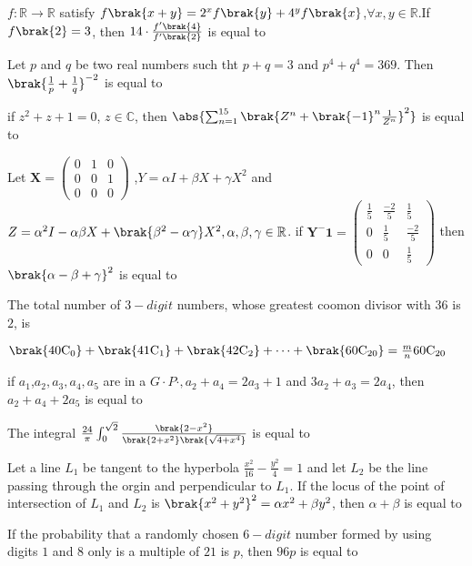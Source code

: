 \iffalse
\title{Assignment 3}
\author{AI24BTECH11018}
\section{integer}
\fi

\item $f: \mathbb{R} \to \mathbb{R}$ satisfy $f\brak{x+y}=2^xf\brak{y}+4^yf\brak{x}$,$\forall x,  y \in \mathbb{R}$.If $f\brak{2}=3$, then $14\cdot \frac{f^{\prime}\brak{4}}{f^{\prime}\brak{2}}$ is equal to 
\hfill{}
    \item Let $p$ and $q$ be two real numbers such tht $p+q=3$
and $p^4+q^4=369$. Then $\brak{\frac{1}{p}+\frac{1}{q}}^{-2}$ is equal to 
\hfill{}
\item if $z^2+z+1=0$, $z \in \mathbb{C}$, then $\abs{\sum_{n=1}^{15}\brak{Z^n+{\brak{-1}^n\frac{1}{Z^n}}}^2}$ is equal to
\hfill{}
\item Let $\mathbf{X} = \begin{pmatrix}
0 & 1 & 0 \\
0 & 0 & 1 \\
0 & 0 & 0
\end{pmatrix}$ ,$Y=\alpha I+\beta X+\gamma X^2$ and $Z={\alpha^2}I-\alpha \beta X+\brak{{\beta^2}-\alpha \gamma}X^2,\alpha ,\beta ,\gamma \in \mathbb{R}$. if $\mathbf{Y^-1} = \begin{pmatrix}
\frac{1}{5} & \frac{-2}{5} & \frac{1}{5} \\
0 & \frac{1}{5} & \frac{-2}{5} \\
0 & 0 & \frac{1}{5}
\end{pmatrix}$ then $\brak{\alpha -\beta +\gamma}^2$ is equal to
\hfill{}
\item The total number of $3-digit$ numbers, whose greatest coomon divisor with $36$ is $2$, is
\hfill{}
\item $\brak{\mathrm{40C_0}}+\brak{\mathrm{41C_1}}+\brak{\mathrm{42C_2}}+\cdots +\brak{\mathrm{60C_{20}}}=\frac{m}{n}\mathrm{60C_{20}}$
\hfill{}
\item if $a_1$,$a_2,a_3,a_4,a_5$ are in a $G\cdot P\cdot ,a_2+a_4=2a_3+1$ and $3a_2+a_3=2a_4$, then $a_2+a_4+2a_5$ is equal to
\hfill{}
\item The integral $\frac{24}{\pi}\int_{0}^{\sqrt{2}}\frac{\brak{2-x^2}}{\brak{2+x^2}\brak{\sqrt{4+x^4}}}$ is equal to 
\hfill{}
\item Let a line $L_1$ be tangent to the hyperbola $\frac{x^2}{16}-\frac{y^2}{4}=1$ and let $L_2$ be the line passing through the orgin and perpendicular to $L_1$. If the locus of the point of intersection of $L_1$ and $L_2$ is $\brak{x^2+y^2}^2=\alpha x^2+\beta y^2$, then $\alpha + \beta $ is equal to 
\hfill{}
\item If the probability that a randomly chosen $6-digit$ number formed by using digits $1$ and $8$ only is a multiple of $21$ is $p$, then $96 p$ is equal to 
\hfill{}

%
